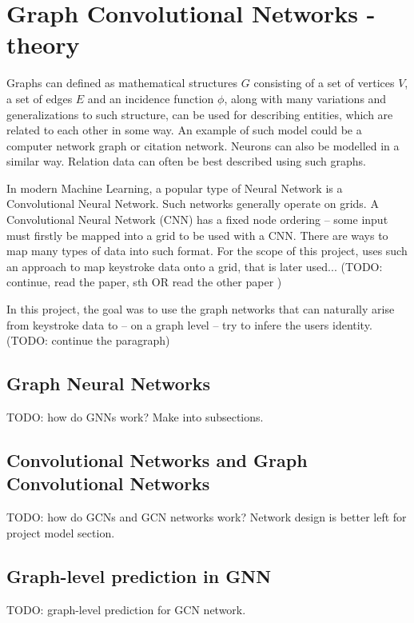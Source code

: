 
\chapter{Graph Convolutional Networks - theory}

Graphs can defined as mathematical structures $G$ consisting of a set of vertices $V$, a set of edges $E$ and an incidence function $\phi$, along with many variations and generalizations to such structure, can be used for describing entities, which are related to each other in some way. An example of such model could be a computer network graph or citation network. Neurons can also be modelled in a similar way. Relation data can often be best described using such graphs. \cite{Lesk2024}

In modern Machine Learning, a popular type of Neural Network is a Convolutional Neural Network. Such networks generally operate on grids. A Convolutional Neural Network (CNN) has a fixed node ordering -- some input must firstly be mapped into a grid to be used with a CNN. There are ways to map many types of data into such format. For the scope of this project, \cite{Shar2023} uses such an approach to map keystroke data onto a grid, that is later used... (TODO: continue, read the paper, sth OR read the other paper \cite{Lu2020})

In this project, the goal was to use the graph networks that can naturally arise from keystroke data to -- on a graph level -- try to infere the users identity. (TODO: continue the paragraph)

\section{Graph Neural Networks}
TODO: how do GNNs work? Make into subsections.

\section{Convolutional Networks and Graph Convolutional Networks}
TODO: how do GCNs and GCN networks work? Network design is better left for project model section.

\section{Graph-level prediction in GNN}
TODO: graph-level prediction for GCN network.